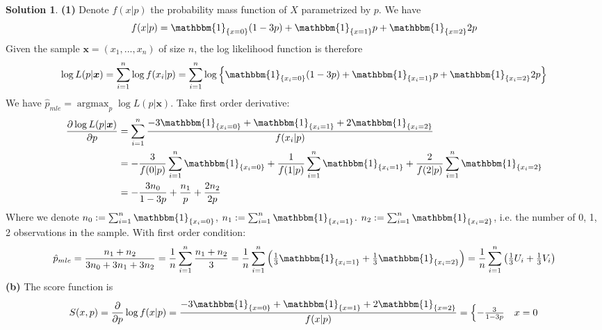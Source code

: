 \documentclass[a4paper, 10pt]{article}
\DeclareMathOperator*{\argmax}{argmax}
\theoremstyle{definition}
\theoremstyle{hSol}
\newtheorem*{solution}{Solution}
\begin{document}
\begin{solution} \textbf{(1)} Denote $f(x|p)$ the probability mass function of $X$ parametrized by $p$. We have
\begin{equation}
  f(x|p) = \mathbbm{1}_{\{x=0\}}(1-3p) + \mathbbm{1}_{\{x=1\}}p + \mathbbm{1}_{\{x=2\}}2p
\end{equation}
Given the sample $\bm{x}=(x_1, ..., x_n)$ of size $n$, the log likelihood function is therefore
\begin{equation}
  \begin{split}
    \log L(p|\bm{x}) = \sum_{i=1}^n \log f(x_i|p) =  \sum_{i=1}^n\log\left\{\mathbbm{1}_{\{x_i=0\}}(1-3p) + \mathbbm{1}_{\{x_i=1\}}p + \mathbbm{1}_{\{x_i=2\}}2p\right\}
  \end{split}
\end{equation}
We have $\hat{p}_{mle}=\argmax_{p}\log L(p|\bm{x})$. Take first order derivative:
\begin{equation}
  \begin{split}
    \frac{\partial \log L(p|\bm{x})}{\partial p} &= \sum_{i=1}^n \frac{-3\mathbbm{1}_{\{x_i=0\}} + \mathbbm{1}_{\{x_i=1\}} + 2\mathbbm{1}_{\{x_i=2\}}}{f(x_i|p)} \\
    &= -\frac{3}{f(0|p)}\sum_{i=1}^n \mathbbm{1}_{\{x_i=0\}} +  \frac{1}{f(1|p)}\sum_{i=1}^n \mathbbm{1}_{\{x_i=1\}}  +  \frac{2}{f(2|p)}\sum_{i=1}^n \mathbbm{1}_{\{x_i=2\}}\\
    &=  -\frac{3n_0}{1-3p} + \frac{n_1}{p} + \frac{2n_2}{2p}
  \end{split}
\end{equation}
Where we denote $n_0:= \sum_{i=1}^n \mathbbm{1}_{\{x_i=0\}}$, $n_1:= \sum_{i=1}^n \mathbbm{1}_{\{x_i=1\}}$. $n_2:= \sum_{i=1}^n \mathbbm{1}_{\{x_i=2\}}$, i.e. the number of 0, 1, 2 observations in the sample. With first order condition:
\begin{equation}
  \hat{p}_{mle} = \frac{n_1 + n_2}{3n_0 + 3n_1 + 3n_2} = \frac{1}{n}\sum_{i=1}^n\frac{n_1+n_2}{3} = \frac{1}{n}\sum_{i=1}^n\left(\tfrac{1}{3}\mathbbm{1}_{\{x_i=1\}} + \tfrac{1}{3}\mathbbm{1}_{\{x_i=2\}}\right) = \frac{1}{n}\sum_{i=1}^n\left(\tfrac{1}{3}U_i + \tfrac{1}{3}V_i\right) 
\end{equation}
\textbf{(b)} The score function is
\begin{equation}
  S(x, p) = \frac{\partial }{\partial p}\log f(x|p) =  \frac{-3\mathbbm{1}_{\{x=0\}} + \mathbbm{1}_{\{x=1\}} + 2\mathbbm{1}_{\{x=2\}}}{f(x|p)} = \begin{cases}
  -\frac{3}{1-3p} & x=0\\

\end{cases}
\end{equation}
\end{solution}
\end{document}

